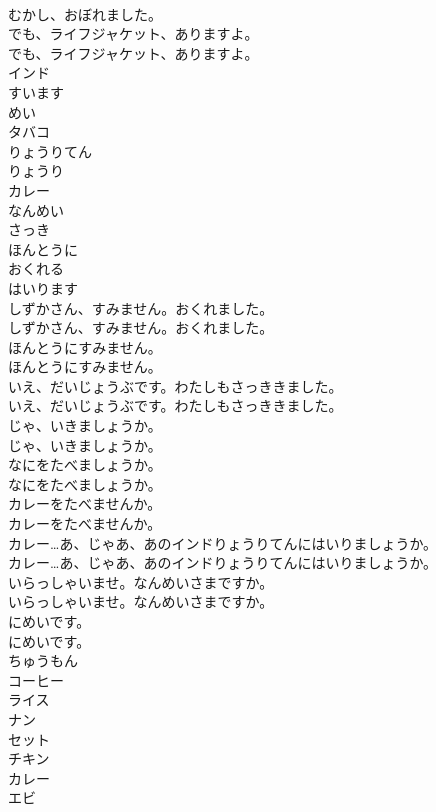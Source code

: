 \documentclass[8pt]{extreport}
\begin{document}
\begin{CJK}{UTF8}{min}
\\	むかし、おぼれました。 
\\	でも、ライフジャケット、ありますよ。	
\\	でも、ライフジャケット、ありますよ。 
\\	インド
\\	すいます
\\	めい
\\	タバコ
\\	りょうりてん
\\	りょうり
\\	カレー
\\	なんめい
\\	さっき
\\	ほんとうに
\\	おくれる
\\	はいります
\\	しずかさん、すみません。おくれました。	
\\	しずかさん、すみません。おくれました。 
\\	ほんとうにすみません。	
\\	ほんとうにすみません。 
\\	いえ、だいじょうぶです。わたしもさっききました。	
\\	いえ、だいじょうぶです。わたしもさっききました。 
\\	じゃ、いきましょうか。	
\\	じゃ、いきましょうか。 
\\	なにをたべましょうか。	
\\	なにをたべましょうか。 
\\	カレーをたべませんか。	
\\	カレーをたべませんか。 
\\	カレー…あ、じゃあ、あのインドりょうりてんにはいりましょうか。	
\\	カレー…あ、じゃあ、あのインドりょうりてんにはいりましょうか。 
\\	いらっしゃいませ。なんめいさまですか。	
\\	いらっしゃいませ。なんめいさまですか。 
\\	にめいです。	
\\	にめいです。 
\\	ちゅうもん
\\	コーヒー
\\	ライス
\\	ナン
\\	セット
\\	チキン
\\	カレー
\\	エビ

\end{CJK}
\end{document}
